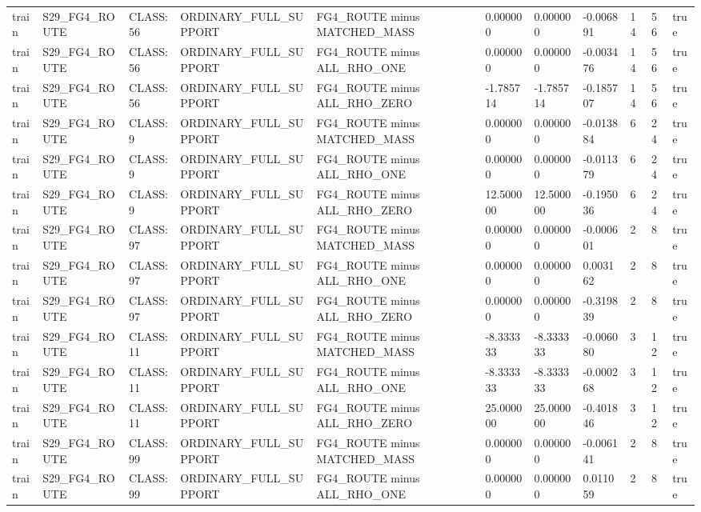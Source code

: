 \begin{tabular}{lllllllllll}
train & S29\_FG4\_ROUTE & CLASS:56 & ORDINARY\_FULL\_SUPPORT & FG4\_ROUTE minus MATCHED\_MASS & 0.000000 & 0.000000 & -0.006891 & 14 & 56 & true \\
train & S29\_FG4\_ROUTE & CLASS:56 & ORDINARY\_FULL\_SUPPORT & FG4\_ROUTE minus ALL\_RHO\_ONE & 0.000000 & 0.000000 & -0.003476 & 14 & 56 & true \\
train & S29\_FG4\_ROUTE & CLASS:56 & ORDINARY\_FULL\_SUPPORT & FG4\_ROUTE minus ALL\_RHO\_ZERO & -1.785714 & -1.785714 & -0.185707 & 14 & 56 & true \\
train & S29\_FG4\_ROUTE & CLASS:9 & ORDINARY\_FULL\_SUPPORT & FG4\_ROUTE minus MATCHED\_MASS & 0.000000 & 0.000000 & -0.013884 & 6 & 24 & true \\
train & S29\_FG4\_ROUTE & CLASS:9 & ORDINARY\_FULL\_SUPPORT & FG4\_ROUTE minus ALL\_RHO\_ONE & 0.000000 & 0.000000 & -0.011379 & 6 & 24 & true \\
train & S29\_FG4\_ROUTE & CLASS:9 & ORDINARY\_FULL\_SUPPORT & FG4\_ROUTE minus ALL\_RHO\_ZERO & 12.500000 & 12.500000 & -0.195036 & 6 & 24 & true \\
train & S29\_FG4\_ROUTE & CLASS:97 & ORDINARY\_FULL\_SUPPORT & FG4\_ROUTE minus MATCHED\_MASS & 0.000000 & 0.000000 & -0.000601 & 2 & 8 & true \\
train & S29\_FG4\_ROUTE & CLASS:97 & ORDINARY\_FULL\_SUPPORT & FG4\_ROUTE minus ALL\_RHO\_ONE & 0.000000 & 0.000000 & 0.003162 & 2 & 8 & true \\
train & S29\_FG4\_ROUTE & CLASS:97 & ORDINARY\_FULL\_SUPPORT & FG4\_ROUTE minus ALL\_RHO\_ZERO & 0.000000 & 0.000000 & -0.319839 & 2 & 8 & true \\
train & S29\_FG4\_ROUTE & CLASS:11 & ORDINARY\_FULL\_SUPPORT & FG4\_ROUTE minus MATCHED\_MASS & -8.333333 & -8.333333 & -0.006080 & 3 & 12 & true \\
train & S29\_FG4\_ROUTE & CLASS:11 & ORDINARY\_FULL\_SUPPORT & FG4\_ROUTE minus ALL\_RHO\_ONE & -8.333333 & -8.333333 & -0.000268 & 3 & 12 & true \\
train & S29\_FG4\_ROUTE & CLASS:11 & ORDINARY\_FULL\_SUPPORT & FG4\_ROUTE minus ALL\_RHO\_ZERO & 25.000000 & 25.000000 & -0.401846 & 3 & 12 & true \\
train & S29\_FG4\_ROUTE & CLASS:99 & ORDINARY\_FULL\_SUPPORT & FG4\_ROUTE minus MATCHED\_MASS & 0.000000 & 0.000000 & -0.006141 & 2 & 8 & true \\
train & S29\_FG4\_ROUTE & CLASS:99 & ORDINARY\_FULL\_SUPPORT & FG4\_ROUTE minus ALL\_RHO\_ONE & 0.000000 & 0.000000 & 0.011059 & 2 & 8 & true \\

\end{tabular}
